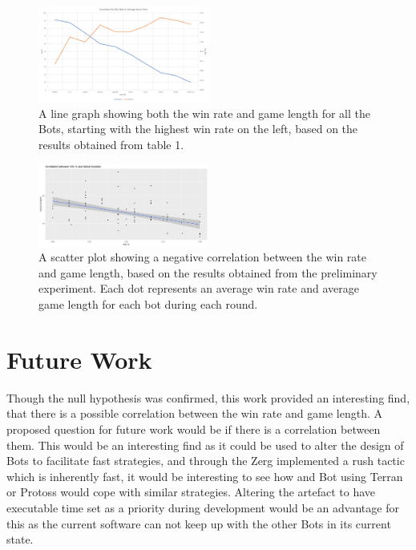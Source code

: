 \documentclass[journal]{IEEEtran}
\begin{document}
	
	\begin{figure}[H]
		\centering
		\includegraphics[width=0.5\textwidth]{WinTimeLineWithBot}
		\caption{A line graph showing both the win rate and game length for all the Bots, starting with the highest win rate on the left, based on the results obtained from table 1.}
		\label{Fig7}
	\end{figure}
	\begin{figure}[H]
		\centering
		\includegraphics[width=0.5\textwidth]{ScatterWinvsDurLine}
		\caption{A scatter plot showing a negative correlation between the win rate and game length, based on the results obtained from the preliminary experiment. Each dot represents an average win rate and average game length for each bot during each round.}
		\label{Fig8}
	\end{figure}
	
	
	
	
	\section{Future Work}
	Though the null hypothesis was confirmed, this work provided an interesting find, that there is a possible correlation between the win rate and game length. A proposed question for future work would be if there is a correlation between them. This would be an interesting find as it could be used to alter the design of Bots to facilitate fast strategies, and through the Zerg implemented a rush tactic which is inherently fast, it would be interesting to see how and Bot using Terran or Protoss would cope with similar strategies.
	Altering the artefact to have executable time set as a priority during development would be an advantage for this as the current software can not keep up with the other Bots in its current state.
	
\end{document}
